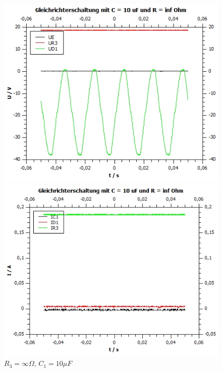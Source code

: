 \documentclass[12pt,a4paper,twoside]{article}
\begin{document}
\begin{figure}[H]
    \begin{minipage}[b]{.5\linewidth} %
        \includegraphics[width=1\linewidth]{nudes/Aufgabe 3 plots/inf ohm 10 uf U.jpg}
        \caption{$R_3 = \infty \Omega$, $C_1 = 10 \mu F$}
    \end{minipage}
    \hspace{0.01\linewidth}%
    \begin{minipage}[b]{.5\linewidth} %
        \includegraphics[width=1\linewidth]{nudes/Aufgabe 3 plots/inf ohm 10 uf I.jpg}
    \caption{$R_3 = \infty \Omega$, $C_1 = 10 \mu F$}
    \end{minipage}
\end{figure}
\end{document}
